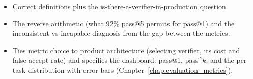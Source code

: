 \begin{interviewq}

\goodgreat
\begin{itemize}
    \item {} Correct definitions plus the is-there-a-verifier-in-production question.
    \item {} The reverse arithmetic (what 92\% pass@5 permits for pass@1) and the inconsistent-vs-incapable diagnosis from the gap between the metrics.
    \item {} Ties metric choice to product architecture (selecting verifier, its cost and false-accept rate) and specifies the dashboard: pass@1, pass\textasciicircum{}$k$, and the per-task distribution with error bars (Chapter~\ref{chap:evaluation_metrics}).
\end{itemize}

\end{interviewq}


